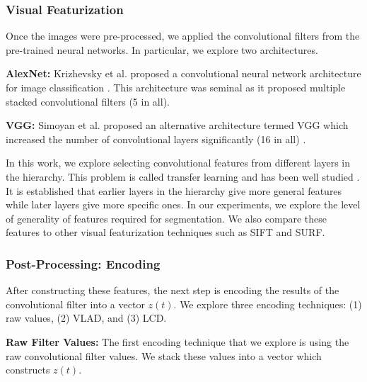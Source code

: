 \subsubsection{Visual Featurization}
Once the images were pre-processed, we applied the convolutional filters from the pre-trained neural networks. In particular, we explore two architectures.

\vspace{0.25em}
\noindent\textbf{AlexNet: } Krizhevsky et al. proposed a convolutional neural network architecture for image classification \cite{krizhevsky2012imagenet}. This architecture was seminal as it proposed multiple stacked convolutional filters (5 in all).   

\vspace{0.25em}
\noindent\textbf{VGG: } Simoyan et al. proposed an alternative architecture termed VGG which increased the number of convolutional layers significantly (16 in all) \cite{simonyan2014very}.

\vspace{0.25em}

In this work, we explore selecting convolutional features from different layers in the hierarchy. 
This problem is called transfer learning and has been well studied .
It is established that earlier layers in the hierarchy give more general features while later layers give more specific ones.
In our experiments, we explore the level of generality of features required for segmentation. 
We also compare these features to other visual featurization techniques such as SIFT and SURF.

\subsubsection{Post-Processing: Encoding}
After constructing these features, the next step is encoding the results of the convolutional filter into a vector $z(t)$.
We explore three encoding techniques: (1) raw values, (2) VLAD, and (3) LCD.

\vspace{0.25em}
\noindent\textbf{Raw Filter Values: } The first encoding technique that we explore is using the raw convolutional filter values. We stack these values into a vector which constructs $z(t)$.


